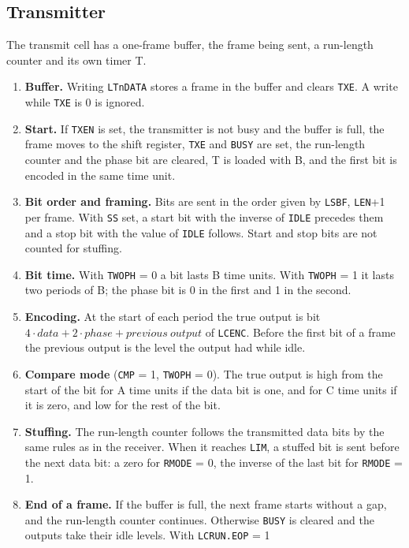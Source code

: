 \documentclass[10pt,a4paper]{article}
\newcommand{\reg}[1]{\texttt{#1}}
\begin{document}
\subsection{Transmitter}

The transmit cell has a one-frame buffer, the frame being sent, a run-length counter and its own timer T.

\begin{enumerate}[label=\textbf{X\arabic*},leftmargin=2.6em]
\item \textbf{Buffer.} Writing \reg{LTnDATA} stores a frame in the buffer and clears \reg{TXE}. A write while
\reg{TXE} is 0 is ignored.
\item \textbf{Start.} If \reg{TXEN} is set, the transmitter is not busy and the buffer is full, the frame moves to
the shift register, \reg{TXE} and \reg{BUSY} are set, the run-length counter and the phase bit are cleared, T
is loaded with B, and the first bit is encoded in the same time unit.
\item \textbf{Bit order and framing.} Bits are sent in the order given by \reg{LSBF}, \reg{LEN}+1 per frame. With
\reg{SS} set, a start bit with the inverse of \reg{IDLE} precedes them and a stop bit with the value of
\reg{IDLE} follows. Start and stop bits are not counted for stuffing.
\item \textbf{Bit time.} With \reg{TWOPH} = 0 a bit lasts B time units. With \reg{TWOPH} = 1 it lasts two periods of B;
the phase bit is 0 in the first and 1 in the second.
\item \textbf{Encoding.} At the start of each period the true output is bit $4\cdot\mathit{data} + 2\cdot\mathit{phase} +
\mathit{previous\ output}$ of \reg{LCENC}. Before the first bit of a frame the previous output is the level the
output had while idle.
\item \textbf{Compare mode} (\reg{CMP} = 1, \reg{TWOPH} = 0). The true output is high from the start of the bit for A
time units if the data bit is one, and for C time units if it is zero, and low for the rest of the bit.
\item \textbf{Stuffing.} The run-length counter follows the transmitted data bits by the same rules as in the
receiver. When it reaches \reg{LIM}, a stuffed bit is sent before the next data bit: a zero for \reg{RMODE} = 0, the
inverse of the last bit for \reg{RMODE} = 1.
\item \textbf{End of a frame.} If the buffer is full, the next frame starts without a gap, and the run-length
counter continues. Otherwise \reg{BUSY} is cleared and the outputs take their idle levels. With \reg{LCRUN.EOP} = 1

\end{enumerate}
\end{document}
